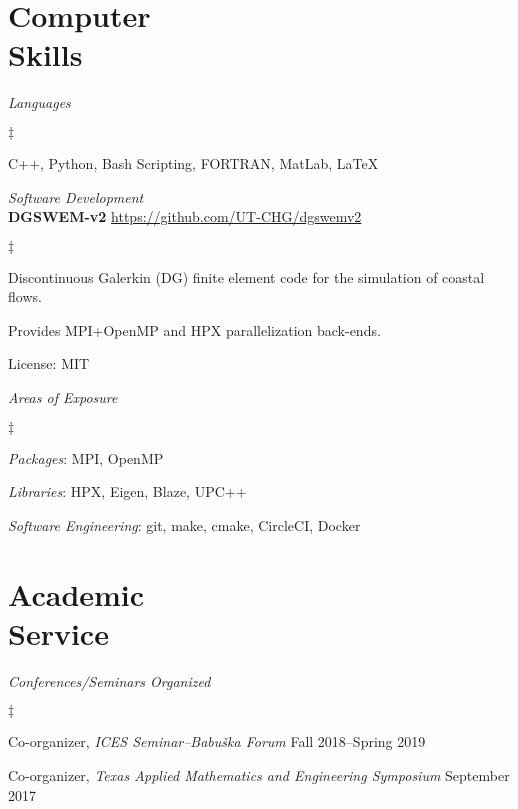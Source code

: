 \documentclass[margin,line]{res}
\newenvironment{list2}{
  \begin{list}{$\ddagger$}{%
      \setlength{\itemsep}{0in}
      \setlength{\parsep}{0in} \setlength{\parskip}{0in}
      \setlength{\topsep}{0in} \setlength{\partopsep}{0in}
      \setlength{\leftmargin}{0.2in}}}{\end{list}}
\begin{document}
\begin{resume}
\section{\sc Computer \\ Skills}

\textit{Languages}
\vspace{0.05in}
\begin{list2}
\item C++, Python, Bash Scripting, FORTRAN, MatLab, \LaTeX
\end{list2}

\textit{Software Development}\\
\vspace{0.05in}
{\bf DGSWEM-v2} \hfill \url{https://github.com/UT-CHG/dgswemv2}
\begin{list2}
\item Discontinuous Galerkin (DG) finite element code for the simulation of coastal flows.
\item Provides MPI+OpenMP and HPX parallelization back-ends.
\item License: MIT
\end{list2}

\textit{Areas of Exposure}
\vspace{0.05in}
\begin{list2}
\item {\em Packages}: MPI, OpenMP
\item {\em Libraries}: HPX, Eigen, Blaze, UPC++
\item {\em Software Engineering}: git, make, cmake, CircleCI, Docker
\end{list2}

\section{\sc Academic \\ Service}

\textit{Conferences/Seminars Organized}
\vspace{0.05in}
\begin{list2}
\item Co-organizer, {\em ICES Seminar--Babu\v{s}ka Forum} \hfill Fall 2018--Spring 2019
\item Co-organizer, {\em Texas Applied Mathematics and Engineering Symposium} \hfill September 2017
\end{list2}


\end{resume}
\end{document}
